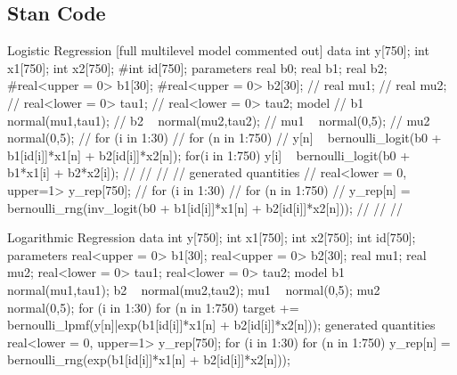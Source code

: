 \documentclass{article}
\begin{document}
\subsection{Stan Code}
\begin{sexylisting}{Logistic Regression [full multilevel model commented out]}
data{
  int y[750];
  int x1[750];
  int x2[750];
  #int id[750];
}
parameters{
  real b0;
  real b1;
  real b2;
  #real<upper = 0> b1[30];
  #real<upper = 0> b2[30];
  // real mu1;
  // real mu2;
  // real<lower = 0> tau1;
  // real<lower = 0> tau2;
}
model{
  // b1 ~ normal(mu1,tau1);
  // b2 ~ normal(mu2,tau2);
  // mu1 ~ normal(0,5);
  // mu2 ~ normal(0,5);
//   for (i in 1:30){
//   for (n in 1:750){
//   y[n] ~ bernoulli_logit(b0 + b1[id[i]]*x1[n] + b2[id[i]]*x2[n]);
for(i in 1:750){
  y[i] ~ bernoulli_logit(b0 + b1*x1[i] + b2*x2[i]);
}
// }
// }
// }
// generated quantities{
//   real<lower = 0, upper=1> y_rep[750];
//   for (i in 1:30){
//   for (n in 1:750){
//     y_rep[n] = bernoulli_rng(inv_logit(b0 + b1[id[i]]*x1[n] + b2[id[i]]*x2[n])); 
  //   }
 // }
// }
\end{sexylisting}
\begin{sexylisting}{Logarithmic Regression}
data{
  int y[750];
  int x1[750];
  int x2[750];
  int id[750];
  }
parameters{
  real<upper = 0> b1[30];
  real<upper = 0> b2[30];
  real mu1;
  real mu2;
  real<lower = 0> tau1;
  real<lower = 0> tau2;
}
model{
  b1 ~ normal(mu1,tau1);
  b2 ~ normal(mu2,tau2);
  mu1 ~ normal(0,5);
  mu2 ~ normal(0,5);
  for (i in 1:30){
  for (n in 1:750){
   target += bernoulli_lpmf(y[n]|exp(b1[id[i]]*x1[n] + b2[id[i]]*x2[n]));
}
}
}
generated quantities{
  real<lower = 0, upper=1> y_rep[750];
  for (i in 1:30){
  for (n in 1:750){
    y_rep[n] = bernoulli_rng(exp(b1[id[i]]*x1[n] + b2[id[i]]*x2[n]));
    }
    }
}
\end{sexylisting}
\end{document}
